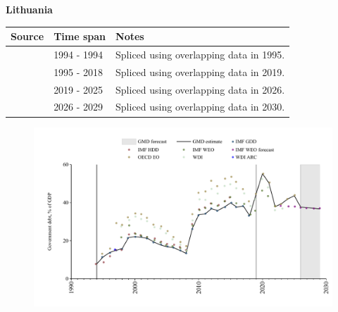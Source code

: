 \documentclass[12pt,a4paper,landscape]{article}
\begin{document}
\begin{adjustbox}{max totalsize={\paperwidth}{\paperheight},center}
\begin{minipage}[t][\textheight][t]{\textwidth}
\vspace*{0.5cm}
{}
\begin{center}
{\Large\bfseries Lithuania}
\end{center}
\vspace{0.5cm}
\begin{table}[H]
\centering
\small
\begin{tabular}{|l|l|l|}
\hline
\textbf{Source} & \textbf{Time span} & \textbf{Notes} \\
\hline
\rowcolor{white}\cite{IMF_HDD}& 1994 - 1994 &Spliced using overlapping data in 1995.\\
\rowcolor{lightgray}\cite{IMF_GDD}& 1995 - 2018 &Spliced using overlapping data in 2019.\\
\rowcolor{white}\cite{OECD_EO}& 2019 - 2025 &Spliced using overlapping data in 2026.\\
\rowcolor{lightgray}\cite{IMF_WEO_forecast}& 2026 - 2029 &Spliced using overlapping data in 2030.\\
\hline
\end{tabular}
\end{table}
\begin{figure}[H]
\centering
\includegraphics[width=\textwidth,height=0.6\textheight,keepaspectratio]{graphs/LTU_govdebt_GDP.pdf}
\end{figure}
\end{minipage}
\end{adjustbox}
\end{document}
